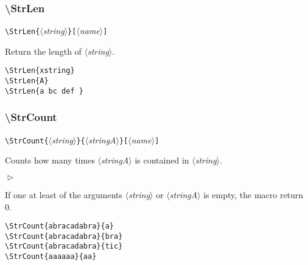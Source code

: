 \documentclass[a4paper,10pt]{article}
\newcommand\argu[1]{$\langle$\textit{#1}$\rangle$}
\newcommand\ARGU[1]{\texttt{\{}\argu{#1}\texttt{\}}}
\newcommand\arguC[1]{\texttt{[}\argu{#1}\texttt{]}}
\newenvironment{Conditions}[1][1cm]%
{\begin{list}%
	{$\vartriangleright$}%
	{\setlength{\leftmargin}{#1}
	 \setlength{\itemsep}{0pt}
	 \setlength{\parsep}{0pt}
	 \setlength{\topsep}{2ptplus3ptminus2pt}
	}}%
{\end{list}}
\newcommand\styleexemple{\small\vskip4pt}
\newcommand\verbinline{\lstinline[basicstyle=\normalsize\ttfamily]}
\begin{document}
\subsubsection{\ttfamily\textbackslash StrLen}

\verbinline|\StrLen|\ARGU{string}\arguC{name}
\smallskip

Return the length of \argu{string}.

\begin{minipage}[t]{0.65\linewidth}
\begin{lstlisting}
\StrLen{xstring}
\StrLen{A}
\StrLen{a bc def }
\end{lstlisting}%
\end{minipage}\hfill
\begin{minipage}[t]{0.35\linewidth}
	\styleexemple
	\par
	\par
\end{minipage}%

\subsubsection{\ttfamily\textbackslash StrCount}

\verbinline|\StrCount|\ARGU{string}\ARGU{stringA}\arguC{name}
\smallskip

Counts how many times \argu{stringA} is contained in \argu{string}.\par\medskip

\begin{Conditions}
\item If one at least of the arguments \argu{string} or \argu{stringA} is empty, the macro return 0.
\end{Conditions}

\begin{minipage}[t]{0.65\linewidth}
\begin{lstlisting}
\StrCount{abracadabra}{a}
\StrCount{abracadabra}{bra}
\StrCount{abracadabra}{tic}
\StrCount{aaaaaa}{aa}
\end{lstlisting}%
\end{minipage}\hfill
\begin{minipage}[t]{0.35\linewidth}
	\styleexemple
	\par
	\par
	\par
\end{minipage}%
\end{document}
